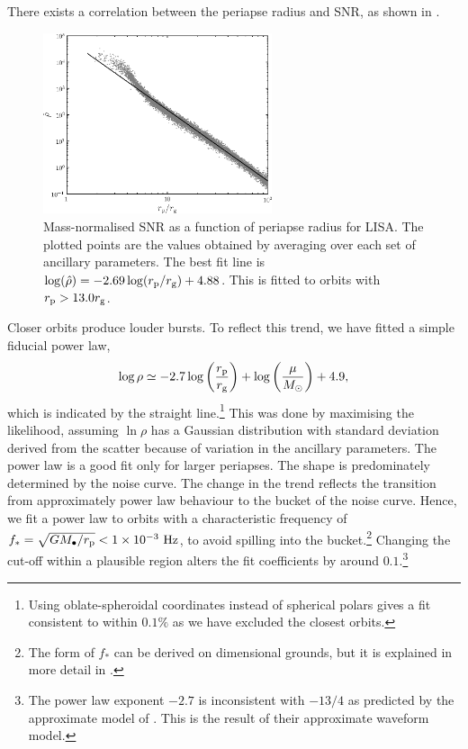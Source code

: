 There exists a correlation between the periapse radius and SNR, as shown in .
\begin{figure}%
  \begin{center}
  \includegraphics[width=0.6\textwidth]{./images/Fig_SNR}
    \caption{Mass-normalised SNR as a function of periapse radius for LISA. The plotted points are the values obtained by averaging over each set of ancillary parameters. The best fit line is $\log(\hat{\rho}) = -2.69\log(r_\mathrm{p}/r_\mathrm{g}) + 4.88$. This is fitted to orbits with $r_\mathrm{p} >  13.0 r_\mathrm{g}$.\label{fig:SNR}} %
  \end{center}
\end{figure}
Closer orbits produce louder bursts. To reflect this trend, we have fitted a simple fiducial power law,
\begin{equation}
\log\rho \simeq -2.7\log\left(\frac{r_\mathrm{p}}{r_\mathrm{g}}\right) + \log\left(\frac{\mu}{M_\odot}\right) + 4.9,
\label{eq:SNR-power-law}
\end{equation}
which is indicated by the straight line.\footnote{Using oblate-spheroidal coordinates instead of spherical polars gives a fit consistent to within $0.1\%$ as we have excluded the closest orbits.} This was done by maximising the likelihood, assuming $\ln \rho$ has a Gaussian distribution with standard deviation derived from the scatter because of variation in the ancillary parameters. The power law is a good fit only for larger periapses. The shape is predominately determined by the noise curve. The change in the trend reflects the transition from approximately power law behaviour to the bucket of the noise curve. Hence, we fit a power law to orbits with a characteristic frequency of $f_\ast = \sqrt{GM_\bullet/r_\mathrm{p}} < 1 \times 10^{-3}~\mathrm{Hz}$, to avoid spilling into the bucket.\footnote{The form of $f_\ast$ can be derived on dimensional grounds, but it is explained in more detail in .} Changing the cut-off within a plausible region alters the fit coefficients by around $0.1$.\footnote{The power law exponent $-2.7$ is inconsistent with $-13/4$ as predicted by the approximate model of \citet{Hopman2007}. This is the result of their approximate waveform model.}

